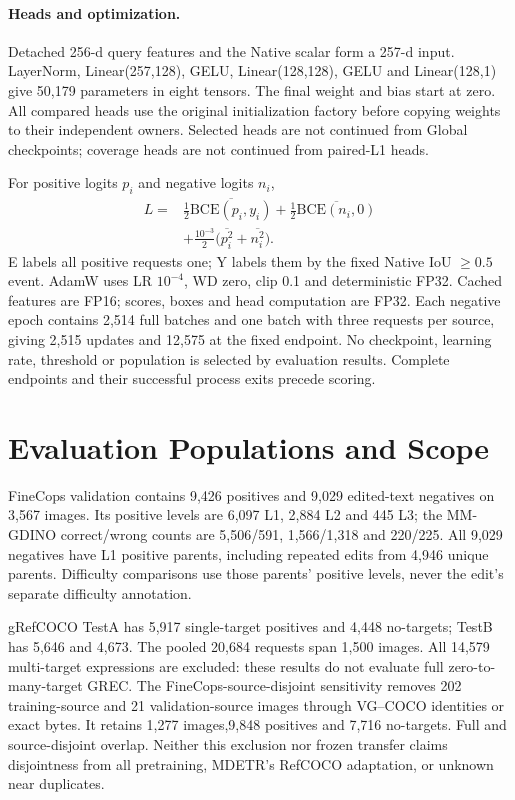 \documentclass[10pt,twocolumn,letterpaper]{article}
\begin{document}
\paragraph{Heads and optimization.}
Detached 256-d query features and the Native scalar form a 257-d input.
LayerNorm, Linear(257,128), GELU, Linear(128,128), GELU and Linear(128,1)
give 50,179 parameters in eight tensors. The final weight and bias start at zero.
All compared heads use the original initialization factory before copying
weights to their independent owners. Selected heads are not continued from
Global checkpoints; coverage heads are not continued from paired-L1 heads.

For positive logits $p_i$ and negative logits $n_i$,
\begin{align}
L={}&\tfrac12\overline{\mathrm{BCE}(p_i,y_i)}
+\tfrac12\overline{\mathrm{BCE}(n_i,0)}\nonumber\\
&+\tfrac{10^{-3}}2\big(\overline{p_i^2}+\overline{n_i^2}\big).
\end{align}
E labels all positive requests one; Y labels them by the fixed Native
IoU $\geq0.5$ event. AdamW uses LR $10^{-4}$, WD zero, clip 0.1 and deterministic
FP32. Cached features are FP16; scores, boxes and head computation are FP32.
Each negative epoch contains 2,514 full batches and one batch with three
requests per source, giving 2,515 updates and 12,575 at the fixed endpoint.
No checkpoint, learning rate, threshold or population is selected by evaluation
results. Complete endpoints and their successful process exits precede scoring.

\section{Evaluation Populations and Scope}
FineCops validation contains 9,426 positives and 9,029 edited-text negatives
on 3,567 images. Its positive levels are 6,097 L1, 2,884 L2 and 445 L3;
the MM-GDINO correct/wrong counts are 5,506/591, 1,566/1,318 and 220/225.
All 9,029 negatives have L1 positive parents, including repeated edits from
4,946 unique parents. Difficulty comparisons use those parents' positive
levels, never the edit's separate difficulty annotation.

gRefCOCO TestA has 5,917 single-target positives and 4,448 no-targets;
TestB has 5,646 and 4,673. The pooled 20,684 requests span 1,500 images.
All 14,579 multi-target expressions are excluded: these results do not evaluate
full zero-to-many-target GREC. The FineCops-source-disjoint sensitivity removes
202 training-source and 21 validation-source images through VG--COCO identities
or exact bytes. It retains 1,277 images,9,848 positives and 7,716 no-targets.
Full and source-disjoint overlap. Neither this exclusion nor frozen transfer
claims disjointness from all pretraining, MDETR's RefCOCO adaptation, or unknown
near duplicates.
\end{document}
